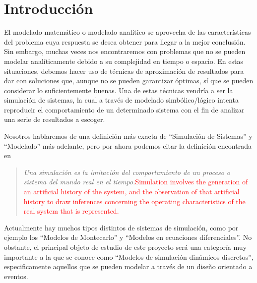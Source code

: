 \chapter{Introducción}\label{ch:introduccion}

El modelado matemático o modelado analítico se aprovecha de las características
del problema cuya respuesta se desea obtener para llegar a la mejor conclusión.
Sin embargo, muchas veces nos encontraremos con problemas que no se pueden
modelar analíticamente debido a su complejidad en tiempo o espacio. En estas
situaciones, debemos hacer uso de técnicas de aproximación de resultados para
dar con soluciones que, aunque no se pueden garantizar óptimas, sí que se pueden
considerar lo suficientemente buenas. Una de estas técnicas vendría a ser la
simulación de sistemas, la cual a través de modelado simbólico/lógico intenta
reproducir el comportamiento de un determinado sistema con el fin de analizar
una serie de resultados a escoger.

Nosotros hablaremos de una definición más exacta de “Simulación de Sistemas” y
“Modelado” más adelante, pero por ahora podemos citar la definición encontrada
en %

\begin{quote}
    \emph{Una simulación es la imitación del comportamiento de un proceso o
    sistema del mundo real en el tiempo.}\textcolor{red}{Simulation involves the
    generation of an artificial history of the system, and the observation of
    that artificial history to draw inferences concerning the operating
    characteristics of the real system that is represented.}
\end{quote}



Actualmente hay muchos tipos distintos de sistemas de simulación, como por
ejemplo los “Modelos de Montecarlo” y “Modelos en ecuaciones diferenciales”. No
obstante, el principal objeto de estudio de este proyecto será una categoría muy
importante a la que se conoce como “Modelos de simulación dinámicos discretos”,
especificamente aquellos que se pueden modelar a través de un diseño orientado a
eventos.

